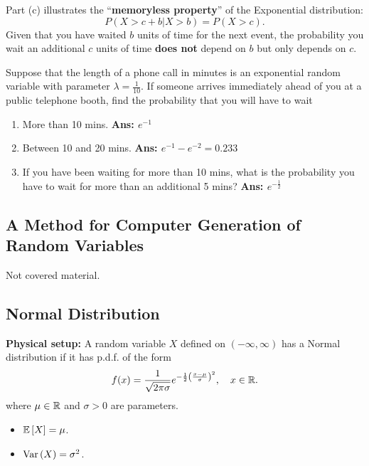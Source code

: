 \begin{remark}
    Part (c) illustrates the ``\textbf{memoryless property}'' of the Exponential distribution:
    \[
        P(X > c + b | X > b) = P(X > c).
    \]
    Given that you have waited $b$ units of time for the next event, the probability you wait an additional $c$ units of time \textbf{does not} depend on $b$ but only depends on $c$. \\
\end{remark}

\pagebreak

\begin{example}
    Suppose that the length of a phone call in minutes is an exponential random variable with parameter $\lambda = \frac{1}{10}$. If someone arrives immediately ahead of you at a public telephone booth, find the probability that you will have to wait
    \begin{enumerate}[label=(\alph*)]
        \item More than 10 mins. \quad \textbf{Ans: $e^{-1}$}
        \item Between 10 and 20 mins. \quad \textbf{Ans: $e^{-1} - e^{-2} = 0.233$}
        \item If you have been waiting for more than 10 mins, what is the probability you have to wait for more than an additional 5 mins? \quad \textbf{Ans: $e^{-\frac{1}{2}}$} \\
    \end{enumerate}
\end{example}


\subsection{A Method for Computer Generation of Random Variables}

Not covered material.

\pagebreak

\subsection{Normal Distribution}

\textbf{Physical setup:} A random variable $X$ defined on $(-\infty, \infty)$ has a Normal distribution if it has p.d.f. of the form
\[
    f(x) = \frac{1}{\sqrt{2\pi\sigma}} e^{-\frac{1}{2}\left(\frac{x-\mu}{\sigma}\right)^2}, \quad x \in {\mathbb{R}}.
\]
where $\mu \in {\mathbb{R}}$ and $\sigma > 0$ are parameters. 

\begin{itemize}
    \item $\mathbb{E}\left[{X}\right] = \mu$.
    \item $\operatorname{Var}\left({X}\right) = \sigma^2$.
\end{itemize}


